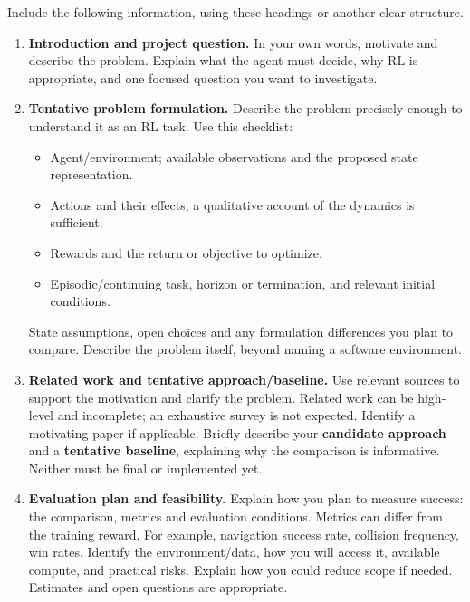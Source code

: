 \documentclass{article}
\begin{document}
\noindent Include the following information, using these headings or another clear structure.
\begin{enumerate}[leftmargin=*,itemsep=3pt]
\item \textbf{Introduction and project question.}
In your own words, motivate and describe the problem. Explain what the agent must decide, why RL is appropriate, and one focused question you want to investigate.

\item \textbf{Tentative problem formulation.}
Describe the problem precisely enough to understand it as an RL task. Use this checklist:
\begin{itemize}[leftmargin=1.5em,itemsep=1pt]
\item Agent/environment; available observations and the proposed state representation.
\item Actions and their effects; a qualitative account of the dynamics is sufficient.
\item Rewards and the return or objective to optimize.
\item Episodic/continuing task, horizon or termination, and relevant initial conditions.
\end{itemize}
State assumptions, open choices and any formulation differences you plan to compare. Describe the problem itself, beyond naming a software environment.

\item \textbf{Related work and tentative approach/baseline.}
Use relevant sources to support the motivation and clarify the problem. Related work can be high-level and incomplete; an exhaustive survey is not expected. Identify a motivating paper if applicable. Briefly describe your \textbf{candidate approach} and a \textbf{tentative baseline}, explaining why the comparison is informative. Neither must be final or implemented yet.

\item \textbf{Evaluation plan and feasibility.}
Explain how you plan to measure success: the comparison, metrics and evaluation conditions. Metrics can differ from the training reward. For example, navigation success rate, collision frequency, win rates. Identify the environment/data, how you will access it, available compute, and practical risks. Explain how you could reduce scope if needed. Estimates and open questions are appropriate.
\end{enumerate}
\end{document}

